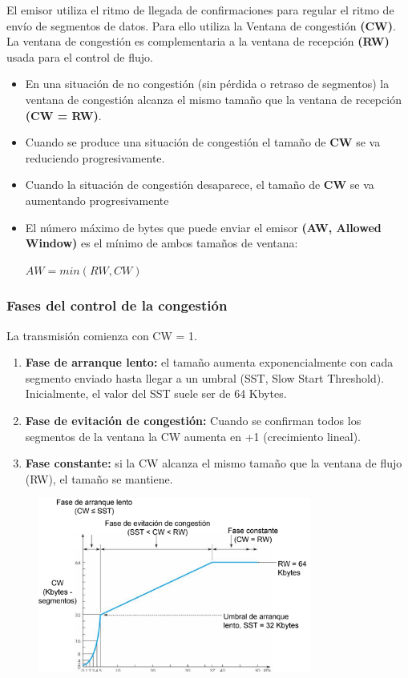 El emisor utiliza el ritmo de llegada de confirmaciones para regular el ritmo de
envío de segmentos de datos. Para ello utiliza la Ventana de congestión \textbf{(CW)}.\\

La ventana de congestión es complementaria a la ventana de recepción \textbf{(RW)} usada para el control de flujo.
\begin{itemize}
    \item En una situación de no congestión (sin pérdida o retraso de segmentos) la ventana de congestión alcanza el mismo tamaño que la ventana de recepción \textbf{(CW = RW)}.
    \item Cuando se produce una situación de congestión el tamaño de \textbf{CW} se va reduciendo progresivamente.
    \item Cuando la situación de congestión desaparece, el tamaño de \textbf{CW} se va aumentando progresivamente
    \item El número máximo de bytes que puede enviar el emisor \textbf{(AW, Allowed Window)} es el mínimo de ambos tamaños de ventana:\\
    \begin{center}
        $AW = min ( RW, CW )$
    \end{center}
\end{itemize}

\subsubsection{Fases del control de la congestión}
La transmisión comienza con CW = 1.
\begin{enumerate}
    \item \textbf{Fase de arranque lento:} el tamaño aumenta exponencialmente con cada segmento enviado hasta llegar a un umbral (SST, Slow Start Threshold). Inicialmente, el valor del SST suele ser de 64 Kbytes.
    \item \textbf{Fase de evitación de congestión:} Cuando se confirman todos los segmentos de la ventana la CW aumenta en +1 (crecimiento lineal).
    \item \textbf{Fase constante:} si la CW alcanza el mismo tamaño que la ventana de flujo (RW), el tamaño se mantiene.
\end{enumerate}
    \begin{figure}[H] \centering
    \includegraphics[width=0.8\textwidth]{img/TCP_FasesCong.png}\end{figure}
    
